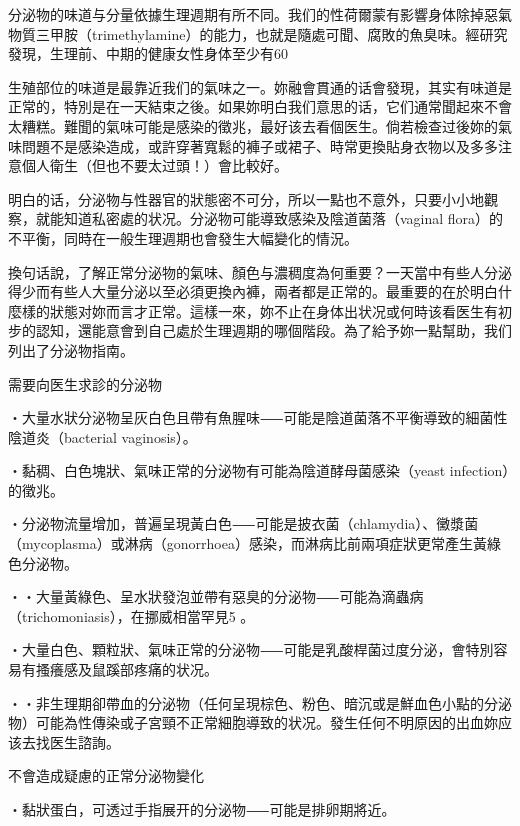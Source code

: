 \documentclass[12pt,UTF8]{ctexbook}
\begin{document}
分泌物的味道与分量依據生理週期有所不同。我们的性荷爾蒙有影響身体除掉惡氣物質三甲胺（trimethylamine）的能力，也就是隨處可聞、腐敗的魚臭味。經研究發現，生理前、中期的健康女性身体至少有60%

生殖部位的味道是最靠近我们的氣味之一。妳融會貫通的话會發現，其实有味道是正常的，特別是在一天結束之後。如果妳明白我们意思的话，它们通常聞起來不會太糟糕。難聞的氣味可能是感染的徵兆，最好该去看個医生。倘若檢查过後妳的氣味問題不是感染造成，或許穿著寬鬆的褲子或裙子、時常更換貼身衣物以及多多注意個人衛生（但也不要太过頭！）會比較好。

明白的话，分泌物与性器官的狀態密不可分，所以一點也不意外，只要小小地觀察，就能知道私密處的状况。分泌物可能導致感染及陰道菌落（vaginal flora）的不平衡，同時在一般生理週期也會發生大幅變化的情況。

換句话說，了解正常分泌物的氣味、顏色与濃稠度為何重要？一天當中有些人分泌得少而有些人大量分泌以至必須更換內褲，兩者都是正常的。最重要的在於明白什麼樣的狀態对妳而言才正常。這樣一來，妳不止在身体出状况或何時该看医生有初步的認知，還能意會到自己處於生理週期的哪個階段。為了給予妳一點幫助，我们列出了分泌物指南。





需要向医生求診的分泌物




‧大量水狀分泌物呈灰白色且帶有魚腥味⸺可能是陰道菌落不平衡導致的細菌性陰道炎（bacterial vaginosis）。

‧黏稠、白色塊狀、氣味正常的分泌物有可能為陰道酵母菌感染（yeast infection）的徵兆。

‧分泌物流量增加，普遍呈現黃白色⸺可能是披衣菌（chlamydia）、黴漿菌（mycoplasma）或淋病（gonorrhoea）感染，而淋病比前兩項症狀更常產生黃綠色分泌物。

‧・大量黃綠色、呈水狀發泡並帶有惡臭的分泌物⸺可能為滴蟲病（trichomoniasis），在挪威相當罕見5 。

‧大量白色、顆粒狀、氣味正常的分泌物⸺可能是乳酸桿菌过度分泌，會特別容易有搔癢感及鼠蹊部疼痛的状况。

‧・非生理期卻帶血的分泌物（任何呈現棕色、粉色、暗沉或是鮮血色小點的分泌物）可能為性傳染或子宮頸不正常細胞導致的状况。發生任何不明原因的出血妳应该去找医生諮詢。





不會造成疑慮的正常分泌物變化




‧黏狀蛋白，可透过手指展开的分泌物⸺可能是排卵期將近。
\end{document}
